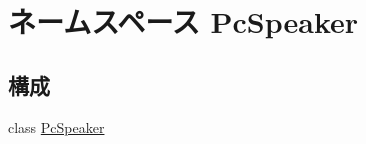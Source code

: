 \hypertarget{namespacePcSpeaker}{
\section{ネームスペース PcSpeaker}
\label{namespacePcSpeaker}
}
\subsection*{構成}
\begin{DoxyCompactItemize}
\item 
class \hyperlink{classPcSpeaker_1_1PcSpeaker}{PcSpeaker}
\end{DoxyCompactItemize}
